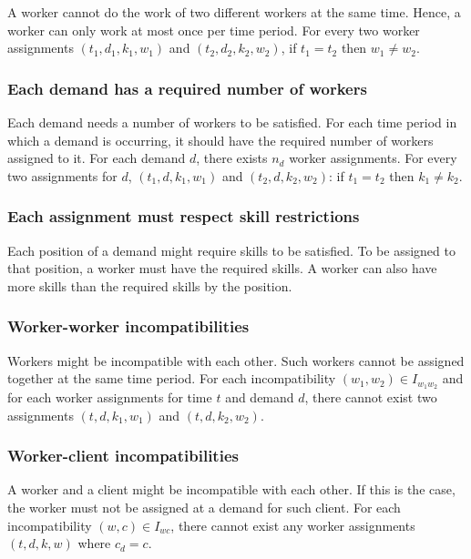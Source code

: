 \documentclass[../thesis.tex]{subfiles}
\begin{document}
A worker cannot do the work of two different workers at the same time.
Hence, a worker can only work at most once per time period.
For every two worker assignments $(t_1, d_1, k_1, w_1)$ and $(t_2, d_2, k_2, w_2)$, if $t_1 = t_2$ then $w_1 \neq w_2$.

\subsubsection{Each demand has a required number of workers}

Each demand needs a number of workers to be satisfied. 
For each time period in which a demand is occurring, it should have the required 
number of workers assigned to it.
For each demand $d$, there exists $n_d$ worker assignments. 
For every two assignments for $d$, $(t_1, d, k_1, w_1)$ and $(t_2, d, k_2, w_2)$: if $t_1 = t_2$ then $k_1 \neq k_2$.

\subsubsection{Each assignment must respect skill restrictions}

Each position of a demand might require skills to be satisfied. 
To be assigned to that position, a worker must have the required skills. 
A worker can also have more skills than the required skills by the position.

\subsubsection{Worker-worker incompatibilities}

Workers might be incompatible with each other. Such workers cannot
be assigned together at the same time period.
For each incompatibility $(w_1, w_2) \in I_{w_1w_2}$ and for each worker assignments for time $t$ and demand $d$,
there cannot exist two assignments $(t, d, k_1, w_1)$ and $(t, d, k_2, w_2)$.

\subsubsection{Worker-client incompatibilities}

A worker and a client might be incompatible with each other. 
If this is the case, the worker must not be assigned at a demand for such client.
For each incompatibility $(w, c) \in I_{wc}$, there cannot exist any worker assignments $(t, d, k, w)$ where 
$c_d = c$.
\end{document}

